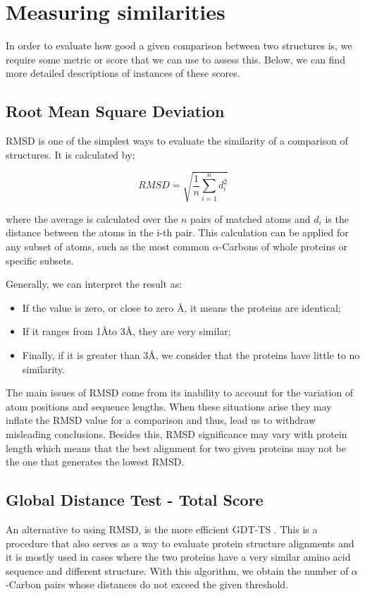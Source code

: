 \section{Measuring similarities}

In order to evaluate how good a given comparison between two structures is, we require some metric or score that we can use to assess this. Below, we can find more detailed descriptions of instances of these scores.

\subsection{Root Mean Square Deviation}

RMSD is one of the simplest ways to evaluate the similarity of a comparison of structures. It is calculated by:

$$RMSD = \sqrt{\frac{1}{n} \sum_{i=1}^{n} d_i^2}$$

where the average is calculated over the $n$ pairs of matched atoms and $d_i$ is the distance between the atoms in the i-th pair. This calculation can be applied for any subset of atoms, such as the most common $\alpha$-Carbons of whole proteins or specific subsets. 

Generally, we can interpret the result as:
\begin{itemize}
	\item If the value is zero, or close to zero \AA, it means the proteins are identical;
	\item If it ranges from 1\AA\quad to 3\AA , they are very similar;
	\item Finally, if it is greater than 3\AA, we consider that the proteins have little to no similarity.
\end{itemize}

The main issues of RMSD come from its inability to account for the variation of atom positions and sequence lengths. When these situations arise they may inflate the RMSD value for a comparison and thus, lead us to withdraw misleading conclusions. Besides this, RMSD significance may vary with protein length which means that the best alignment for two given proteins may not be the one that generates the lowest RMSD. 

\medskip
\subsection{Global Distance Test - Total Score}

An alternative to using RMSD, is the more efficient \gls{GDT-TS} \cite{zemla2003lga}. This is a procedure that also serves as a way to evaluate protein structure alignments and it is mostly used in cases where the two proteins have a very similar amino acid sequence and different structure. With this algorithm, we obtain the number of $\alpha$-Carbon pairs whose distances do not exceed the given threshold. 


